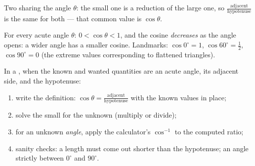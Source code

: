 \begin{omfigure}

{\small Two  sharing the angle $\theta$: the small one
is a reduction of the large one, so
$\frac{\text{adjacent}}{\text{hypotenuse}}$ is the same for both ---
that common value is $\cos\theta$.}
\end{omfigure}

\begin{proposition}\label{prop:g8:cosine:bounds}
For every acute angle $\theta$: $0 < \cos\theta < 1$, and the cosine
\emph{decreases} as the angle opens: a wider angle has a smaller
cosine. Landmarks: $\cos 0^\circ = 1$, $\cos 60^\circ = \frac12$,
$\cos 90^\circ = 0$ (the extreme values corresponding to flattened
triangles).
\end{proposition}
\admitted

\begin{method}\label{met:g8:cosine:use}
In a , when the known and wanted quantities are an
acute angle, its adjacent side, and the hypotenuse:
\begin{enumerate}
  \item write the definition:
        $\cos\theta = \frac{\text{adjacent}}{\text{hypotenuse}}$ with
        the known values in place;
  \item solve the small  for the unknown (multiply or divide);
  \item for an unknown \emph{angle}, apply the calculator's
        $\cos^{-1}$ to the computed ratio;
  \item sanity checks: a length must come out shorter than the
        hypotenuse; an angle strictly between $0^\circ$ and
        $90^\circ$.
\end{enumerate}
\end{method}

